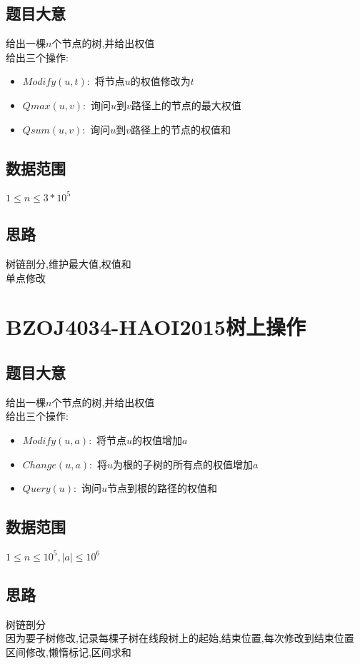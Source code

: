 \documentclass{ctexart}
\numberwithin{equation}{section}
\begin{document}
\begin{flushleft}
  \subsection{题目大意}
  给出一棵$n$个节点的树,并给出权值 \\
  给出三个操作: \\
  \begin{itemize}
  \item $Modify(u,t):$ 将节点$u$的权值修改为$t$
  \item $Qmax(u,v):$ 询问$u$到$v$路径上的节点的最大权值
  \item $Qsum(u,v):$ 询问$u$到$v$路径上的节点的权值和
  \end{itemize}
  \subsection{数据范围}
  $1\le n\le 3*10^5$ \\
  \subsection{思路}
  树链剖分,维护最大值,权值和\\
  单点修改 \\
  \newpage

  \section{BZOJ4034-HAOI2015树上操作}
  \subsection{题目大意}
  给出一棵$n$个节点的树,并给出权值 \\
  给出三个操作: \\
  \begin{itemize}
  \item $Modify(u,a):$ 将节点$u$的权值增加$a$
  \item $Change(u,a):$ 将$u$为根的子树的所有点的权值增加$a$
  \item $Query(u):$ 询问$u$节点到根的路径的权值和
  \end{itemize}
  \subsection{数据范围}
  $1\le n\le 10^5,|a|\le 10^6$ \\
  \subsection{思路}
  树链剖分\\
  因为要子树修改,记录每棵子树在线段树上的起始,结束位置,每次修改到结束位置\\
  区间修改,懒惰标记,区间求和\\


\end{flushleft}
\end{document}
